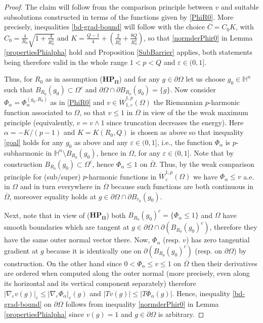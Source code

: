 \documentclass[10pt]{amsart}
\numberwithin{equation}{section}
\theoremstyle{definition}
\newcommand{\He}{\mathbb{H}}
\begin{document}
\begin{proof}
The claim will follow from the comparison principle between $v$ and suitable subsolutions  constructed in terms of the functions given by \eqref{PhiR0}.  More precisely, inequalities \eqref{bd-grad-bound} will follow with the choice $\overline{C}=C_0 K$, with $C_0=\frac{4}{R_0} \sqrt{1+\frac{4}{R_0^2}}$ and $K= \frac{Q-1}4 +  \left(\frac{2}{R_0^2} +  \frac{8 Q}{R_0^4} \right) $, so that \eqref{normderPhir0} in Lemma \ref{propertiesPhialpha} hold and Proposition \ref{SubBarrier} applies, both statements being therefore valid in the whole range $1<p <Q$ and $\varepsilon \in (0,1]$. 

Thus, for $R_0$ as in assumption ($\mathbf{HP_\Omega}$) and for any $g \in \partial \Omega$ let us choose  $g_0\in \He^n$ such that $B_{R_0}(g_0) \subset \Omega^{c}$ and $\partial \Omega \cap \partial B_{R_0}(g_0)=\{ g\}$. Now consider $\Phi_\alpha=\Phi_\alpha^{(g_0,R_0)}$ as in \eqref{PhiR0} and $v \in \dot{W}^{1,p}_{1, \varepsilon} (\Omega)$ the Riemannian $p$-harmonic function associated to $\Omega$, so that $v \leq 1$ in $\overline{\Omega}$ in view of the the weak maximum principle (equivalently, $v=v \wedge 1$ since truncation decreases the energy).
Here $\alpha=-K/(p-1)$ and $K=K(R_0,Q)$ is chosen as above so that inequality \eqref{goal} holds for any $g_0$ as above and any $\varepsilon \in (0,1]$, i.e., the function $\Phi_\alpha$ is $p$-subharmonic in $\He^n\setminus B_{R_0}(g_0)$, hence in $\Omega$, for any $\varepsilon \in (0,1]$. 
Note that by construction $B_{R_0}(g_0) \subset \Omega^{c} $, hence $ \Phi_\alpha \leq 1$ on $\overline{\Omega}$. Thus, by the weak comparison principle for (sub/super) $p$-harmonic functions in $\dot{W}^{1,p}_\varepsilon(\Omega)$ we have $\Phi_\alpha \leq v$ a.e. in $\Omega$ and in turn everywhere in $\overline{\Omega}$ because such functions are both continuous in $\overline{\Omega}$, moreover equality holds at $g \in \partial \Omega\cap \partial B_{r_0}(g_0)$. 
 
 
 Next, note that in view of ($\mathbf{HP_\Omega}$) both $ B_{R_0}(g_0)^c= \{ \Phi_\alpha \leq 1\}$ and $\Omega$ have smooth boundaries which are tangent at $g \in \partial \Omega \cap \partial \left(B_{R_0}(g_0)^c \right)$, therefore they have the same outer normal vector there. Now, $\Phi_\alpha$ (resp. $v$) has zero tangential gradient at $g$ because it is identically one on $\partial \left( B_{R_0}(g_0)^c \right)$ (resp. on $\partial \Omega$) by construction. On the other hand since $0<\Phi_\alpha \leq v \leq 1$ on $\overline{\Omega}$ then their derivatives are ordered when computed along the outer normal (more precisely, even along its horizontal and its vertical component separately) therefore $|\nabla_\varepsilon  v (g)|_\varepsilon \leq |\nabla_\varepsilon  \Phi_\alpha|_\varepsilon (g) $ and $|T v (g)| \leq |T \Phi_\alpha (g)|$. Hence, inequality \eqref{bd-grad-bound} on $\partial \Omega$ follows from inequality \eqref{normderPhir0} in Lemma \ref{propertiesPhialpha} since $v(g)=1$ and $g \in \partial \Omega$ is arbitrary.  
 \end{proof}
\end{document}
